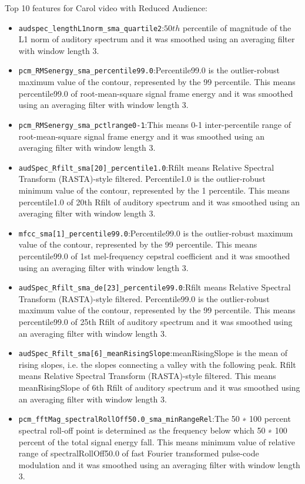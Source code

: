 Top 10 features for Carol video with Reduced Audience:
\begin{itemize}
\item \verb|audspec_lengthL1norm_sma_quartile2|:$50th$ percentile of magnitude of the L1 norm of auditory spectrum and it was smoothed using an averaging filter with window length 3.
\item \verb|pcm_RMSenergy_sma_percentile99.0|:Percentile99.0 is the outlier-robust maximum value of the contour, represented by the 99 percentile. This means percentile99.0 of root-mean-square signal frame energy and it was smoothed using an averaging filter with window length 3.
\item \verb|pcm_RMSenergy_sma_pctlrange0-1|:This means 0-1 inter-percentile range of root-mean-square signal frame energy and it was smoothed using an averaging filter with window length 3.
\item \verb|audSpec_Rfilt_sma[20]_percentile1.0|:Rfilt means Relative Spectral Transform (RASTA)-style filtered. Percentile1.0 is the outlier-robust minimum value of the contour, represented by the 1 percentile. This means percentile1.0 of 20th Rfilt of auditory spectrum and it was smoothed using an averaging filter with window length 3.
\item \verb|mfcc_sma[1]_percentile99.0|:Percentile99.0 is the outlier-robust maximum value of the contour, represented by the 99 percentile. This means percentile99.0 of 1st mel-frequency cepstral coefficient and it was smoothed using an averaging filter with window length 3.
\item \verb|audSpec_Rfilt_sma_de[23]_percentile99.0|:Rfilt means Relative Spectral Transform (RASTA)-style filtered. Percentile99.0 is the outlier-robust maximum value of the contour, represented by the 99 percentile. This means percentile99.0 of 25th Rfilt of auditory spectrum and it was smoothed using an averaging filter with window length 3.
\item \verb|audSpec_Rfilt_sma[6]_meanRisingSlope|:meanRisingSlope is the mean of rising slopes, i.e. the slopes connecting a valley with the following peak. Rfilt means Relative Spectral Transform (RASTA)-style filtered. This means meanRisingSlope of 6th Rfilt of auditory spectrum and it was smoothed using an averaging filter with window length 3.
\item \verb|pcm_fftMag_spectralRollOff50.0_sma_minRangeRel|:The 50 ∗ 100 percent spectral roll-off point is determined as the frequency below which 50 ∗ 100 percent of the total signal energy fall. This means minimum value of relative range of spectralRollOff50.0 of fast Fourier transformed pulse-code modulation and it was smoothed using an averaging filter with window length 3.

\end{itemize}
